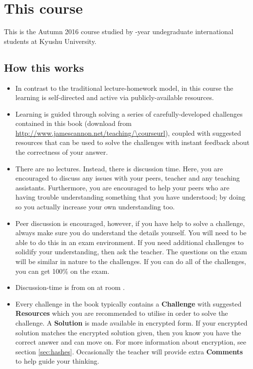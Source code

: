 \section{This course}
This is the Autumn 2016 \course course studied by \nensei-year undegraduate international students at Kyushu University.

\subsection{How this works}
\begin{itemize}
    \item In contrast to the traditional lecture-homework model, in this course the learning is self-directed and active via publicly-available resources.
    \item Learning is guided through solving a series of carefully-developed challenges contained in this book (download from \url{http://www.jamescannon.net/teaching/\courseurl}), coupled with suggested resources that can be used to solve the challenges with instant feedback about the correctness of your answer.
    \item There are no lectures. Instead, there is discussion time. Here, you are encouraged to discuss any issues with your peers, teacher and any teaching assistants. Furthermore, you are encouraged to help your peers who are having trouble understanding something that you have understood; by doing so you actually increase your own understanding too.
    \item Peer discussion is encouraged, however, if you have help to solve a challenge, always make sure you do understand the details yourself. You will need to be able to do this in an exam environment. If you need additional challenges to solidify your understanding, then ask the teacher. The questions on the exam will be similar in nature to the challenges. If you can do all of the challenges, you can get 100\% on the exam.
    \item Discussion-time is from \disctime on \discdays at room \discroom.
    \item Every challenge in the book typically contains a \textbf{Challenge} with suggested \textbf{Resources} which you are recommended to utilise in order to solve the challenge. A \textbf{Solution} is made available in encrypted form. If your encrypted solution matches the encrypted solution given, then you know you have the correct answer and can move on. For more information about encryption, see section \ref{sec:hashes}. Occasionally the teacher will provide extra \textbf{Comments} to help guide your thinking.

\end{itemize}
